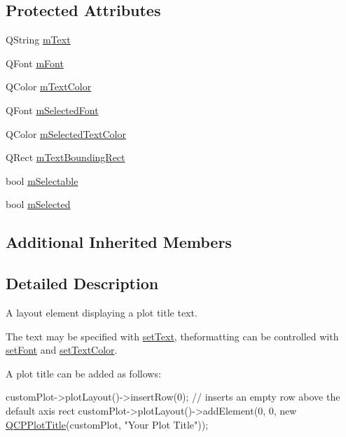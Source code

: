 \subsection*{Protected Attributes}
\begin{DoxyCompactItemize}
\item 
Q\+String \hyperlink{class_q_c_p_plot_title_a0d961bfac1211d59d3b0bc30d35f6379}{m\+Text}
\item 
Q\+Font \hyperlink{class_q_c_p_plot_title_ad9e2c2a2e941f3444cb692a51df0df62}{m\+Font}
\item 
Q\+Color \hyperlink{class_q_c_p_plot_title_a5d7f834d6522c1a72fb0682c0b7ebe13}{m\+Text\+Color}
\item 
Q\+Font \hyperlink{class_q_c_p_plot_title_a95003186c39bbab902873a8ef4cbb547}{m\+Selected\+Font}
\item 
Q\+Color \hyperlink{class_q_c_p_plot_title_a8b9760e62af92814c4effdd7ad69c5f9}{m\+Selected\+Text\+Color}
\item 
Q\+Rect \hyperlink{class_q_c_p_plot_title_a7178a0f6c1e633c144c17b4de4e0b840}{m\+Text\+Bounding\+Rect}
\item 
bool \hyperlink{class_q_c_p_plot_title_aadefb5e2b19b1cc7deda0a55ec747884}{m\+Selectable}
\item 
bool \hyperlink{class_q_c_p_plot_title_afef1342a20f5ca985a20b9cfdc03d815}{m\+Selected}
\end{DoxyCompactItemize}
\subsection*{Additional Inherited Members}


\subsection{Detailed Description}
A layout element displaying a plot title text. 

The text may be specified with \hyperlink{class_q_c_p_plot_title_aae5a93e88050dfb2cbf6adc087516821}{set\+Text}, theformatting can be controlled with \hyperlink{class_q_c_p_plot_title_a199fc7170802ea65006c371875349e37}{set\+Font} and \hyperlink{class_q_c_p_plot_title_a71273e3a0ca6b4c151591b37b9e5ce33}{set\+Text\+Color}.

A plot title can be added as follows\+: 
\begin{DoxyCode}
customPlot->plotLayout()->insertRow(0); \textcolor{comment}{// inserts an empty row above the default axis rect}
customPlot->plotLayout()->addElement(0, 0, \textcolor{keyword}{new} \hyperlink{class_q_c_p_plot_title_aaae17bee2de6d6a1e695f76fb1abed03}{QCPPlotTitle}(customPlot, \textcolor{stringliteral}{"Your Plot Title"}));
\end{DoxyCode}


